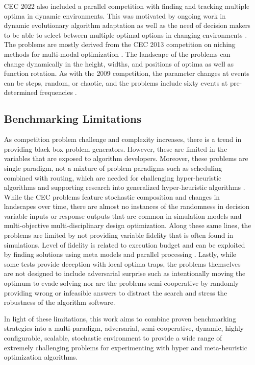 \documentclass[a4paper]{article}
\begin{document}
CEC 2022 also included a parallel competition with finding and tracking multiple optima in dynamic environments. This was motivated by ongoing work in dynamic evolutionary algorithm adaptation as well as the need of decision makers to be able to select between multiple optimal options in changing environments \cite{luo_benchmark_2022}. The problems are mostly derived from the CEC 2013 competition on niching methods for multi-modal optimization \cite{li_benchmark_2013}. The landscape of the problems can change dynamically in the height, widths, and positions of optima as well as function rotation. As with the 2009 competition, the parameter changes at events can be steps, random, or chaotic, and the problems include sixty events at pre-determined frequencies \cite{luo_benchmark_2022}.



\subsection{Benchmarking Limitations}

As competition problem challenge and complexity increases, there is a trend in providing black box problem generators. However, these are limited in the variables that are exposed to algorithm developers. Moreover, these problems are single paradigm, not a mixture of problem paradigms such as scheduling combined with routing, which are needed for challenging hyper-heuristic algorithms and supporting research into generalized hyper-heuristic algorithms \cite{dokeroglu_hyper-heuristics_2024}. While the CEC problems feature stochastic composition and changes in landscapes over time, there are almost no instances of the randomness in decision variable inputs or response outputs that are common in simulation models and multi-objective multi-disciplinary design optimization. Along these same lines, the problems are limited by not providing variable fidelity that is often found in simulations. Level of fidelity is related to execution budget and can be exploited by finding solutions using meta models and parallel processing \cite{martins_engineering_2021}. Lastly, while some tests provide deception with local optima traps, the problems themselves are not designed to include adversarial surprise such as intentionally moving the optimum to evade solving nor are the problems semi-cooperative by randomly providing wrong or infeasible answers to distract the search and stress the robustness of the algorithm software.

In light of these limitations, this work aims to combine proven benchmarking strategies into a multi-paradigm, adversarial, semi-cooperative, dynamic, highly configurable, scalable, stochastic environment to provide a wide range of extremely challenging problems for experimenting with hyper and meta-heuristic optimization algorithms.
\end{document}

